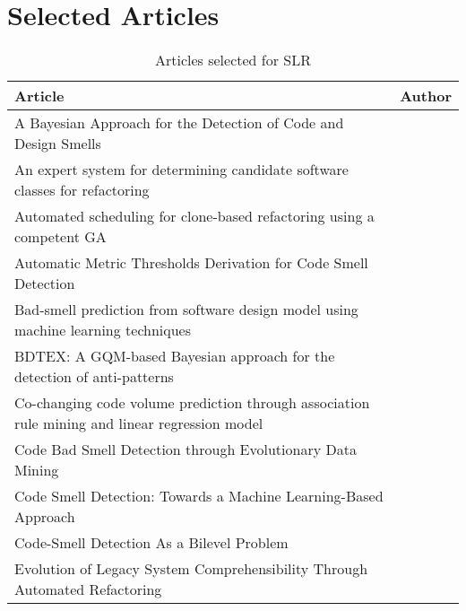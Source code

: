 \documentclass[preprint,review,12pt]{elsarticle}
\begin{document}
\section{Selected Articles}
\label{app:slrArticles}
\begin{longtable}{|p{}|p{}|}
\caption{Articles selected for SLR}
\label{tab:slrArticles} \\
\hline
Article                                                                                                & Author                        \\ \hline
\hline
A Bayesian Approach for the Detection of Code and Design Smells                                        & \cite{khomh2009Bayesian}      \\ \hline
An expert system for determining candidate software classes for refactoring                            & \cite{Kosker2009}             \\ \hline
Automated scheduling for clone-based refactoring using a competent GA                                  & \cite{lee2011automated}       \\ \hline
Automatic Metric Thresholds Derivation for Code Smell Detection                                        & \cite{Fontana2015Automatic}   \\ \hline
Bad-smell prediction from software design model using machine learning techniques                      & \cite{Maneerat2011}           \\ \hline
BDTEX: A GQM-based Bayesian approach for the detection of anti-patterns                                 & \cite{khomh2011}              \\ \hline
Co-changing code volume prediction through association rule mining and linear regression model         & \cite{Lee2016Cochanging}      \\ \hline
Code Bad Smell Detection through Evolutionary Data Mining                                              & \cite{Fu2015}                 \\ \hline
Code Smell Detection: Towards a Machine Learning-Based Approach                                        & \cite{Fontana2013}            \\ \hline
Code-Smell Detection As a Bilevel Problem                                                              & \cite{sahin2014code}          \\ \hline
Evolution of Legacy System Comprehensibility Through Automated Refactoring                             & \cite{Griffith2011}           \\ \hline

\end{longtable}
\end{document}
